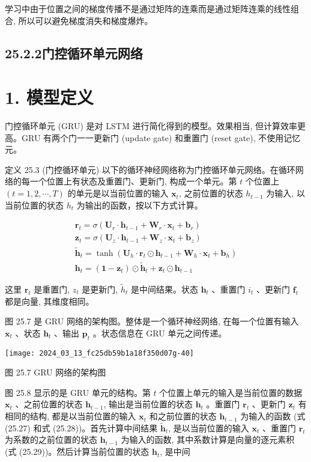 \documentclass[10pt]{article}
\begin{document}
学习中由于位置之间的梯度传播不是通过矩阵的连乘而是通过矩阵连乘的线性组合, 所以可以避免梯度消失和梯度爆炸。

\subsection*{25.2.2门控循环单元网络}
\section*{1. 模型定义}
门控循环单元 (GRU) 是对 LSTM 进行简化得到的模型。效果相当, 但计算效率更高。GRU 有两个门一一更新门 (update gate) 和重置门 (reset gate), 不使用记忆元。

定义 25.3 (门控循环单元) 以下的循环神经网络称为门控循环单元网络。在循环网络的每一个位置上有状态及重置门、更新门, 构成一个单元。第 $t$ 个位置上 $(t=1,2, \cdots, T)$ 的单元是以当前位置的输入 $\boldsymbol{x}_{t}$, 之前位置的状态 $h_{t-1}$ 为输入, 以当前位置的状态 $h_{t}$ 为输出的函数，按以下方式计算。


\begin{gather*}
\boldsymbol{r}_{t}=\sigma\left(\boldsymbol{U}_{r} \cdot \boldsymbol{h}_{t-1}+\boldsymbol{W}_{r} \cdot \boldsymbol{x}_{t}+\boldsymbol{b}_{r}\right)  \tag{25.27}\\
\boldsymbol{z}_{t}=\sigma\left(\boldsymbol{U}_{z} \cdot \boldsymbol{h}_{t-1}+\boldsymbol{W}_{z} \cdot \boldsymbol{x}_{t}+\boldsymbol{b}_{z}\right)  \tag{25.28}\\
\tilde{\boldsymbol{h}}_{t}=\tanh \left(\boldsymbol{U}_{h} \cdot \boldsymbol{r}_{t} \odot \boldsymbol{h}_{t-1}+\boldsymbol{W}_{h} \cdot \boldsymbol{x}_{t}+\boldsymbol{b}_{h}\right)  \tag{25.29}\\
\boldsymbol{h}_{t}=\left(\boldsymbol{1}-\boldsymbol{z}_{t}\right) \odot \tilde{\boldsymbol{h}}_{t}+\boldsymbol{z}_{t} \odot \boldsymbol{h}_{t-1} \tag{25.30}
\end{gather*}


这里 $\boldsymbol{r}_{t}$ 是重置门, $z_{t}$ 是更新门, $\tilde{h}_{t}$ 是中间结果。状态 $\boldsymbol{h}_{t}$ 、重置门 $i_{t}$ 、更新门 $\boldsymbol{f}_{t}$ 都是向量, 其维度相同。

图 25.7 是 GRU 网络的架构图。整体是一个循环神经网络, 在每一个位置有输入 $\boldsymbol{x}_{t}$ 、状态 $\boldsymbol{h}_{t}$ 、输出 $\boldsymbol{p}_{t}$ 。状态信息在 GRU 单元之间传递。

\begin{center}
\texttt{[image: 2024\_03\_13\_fc25db59b1a18f350d07g-40]}
\end{center}

图 25.7 GRU 网络的架构图

图 25.8 显示的是 GRU 单元的结构。第 $t$ 个位置上单元的输入是当前位置的数据 $\boldsymbol{x}_{t}$ 、之前位置的状态 $\boldsymbol{h}_{t-1}$, 输出是当前位置的状态 $\boldsymbol{h}_{t}$ 。重置门 $\boldsymbol{r}_{t}$ 、更新门 $\boldsymbol{z}_{t}$ 有相同的结构, 都是以当前位置的输入 $\boldsymbol{x}_{t}$ 和之前位置的状态 $\boldsymbol{h}_{t-1}$ 为输入的函数 (式 (25.27) 和式 (25.28))。首先计算中间结果 $\tilde{\boldsymbol{h}}_{t}$, 是以当前位置的输入 $\boldsymbol{x}_{t}$ 、重置门 $\boldsymbol{r}_{t}$ 为系数的之前位置的状态 $\boldsymbol{h}_{t-1}$ 为输入的函数, 其中系数计算是向量的逐元素积 (式 (25.29))。然后计算当前位置的状态 $\boldsymbol{h}_{t}$, 是中间
\end{document}

